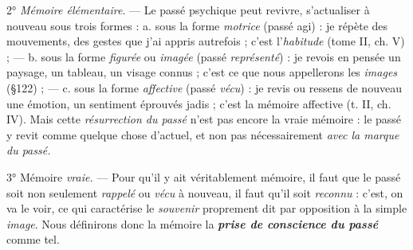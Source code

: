 2° {\it Mémoire élémentaire}. — Le passé psychique peut revivre, s’actualiser
à nouveau sous trois formes : a. sous la forme {\it motrice} (passé agi) :
je répète des mouvements, des gestes que j'ai appris autrefois ; c’est
l'{\it habitude} (tome II, ch. V) ; — b. sous la forme {\it figurée} ou {\it imagée} (passé
{\it représenté}) : je revois en pensée un paysage, un tableau, un visage
connus ; c’est ce que nous appellerons les {\it images}
(\S 122)
; — c. sous
la forme {\it affective} (passé {\it vécu}) : je revis ou ressens de nouveau une émotion,
un sentiment éprouvés jadis ; c’est la mémoire affective (t. II,
ch. IV). Mais cette {\it résurrection du passé} n’est pas encore la vraie
mémoire : le passé y revit comme quelque chose d’actuel, et non pas
nécessairement {\it avec la marque du passé.}

3° Mémoire {\it vraie.} — Pour qu’il y ait véritablement mémoire, il
faut que le passé soit non seulement {\it rappelé} ou {\it vécu} à nouveau, il
faut qu’il soit {\it reconnu} : c’est, on va le voir, ce qui caractérise le {\it souvenir}
proprement dit par opposition à la simple {\it image}. Nous définirons
donc la mémoire la \textbf{\textit {prise de conscience du passé}} comme tel.

